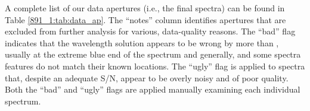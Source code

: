 




A complete list of our data apertures (i.e., the final spectra) can be
found in Table \ref{891_1:tab:data_ap}. The ``notes'' column identifies
apertures that are excluded from further analysis for various,
data-quality reasons. The ``bad'' flag indicates that the wavelength
solution appears to be wrong by more than ,
usually at the extreme blue end of the spectrum and generally, and
some spectra features do not match their known locations. The ``ugly''
flag is applied to spectra that, despite an adequate S/N, appear to be
overly noisy and of poor quality. Both the ``bad'' and ``ugly'' flags
are applied manually examining each individual spectrum.

